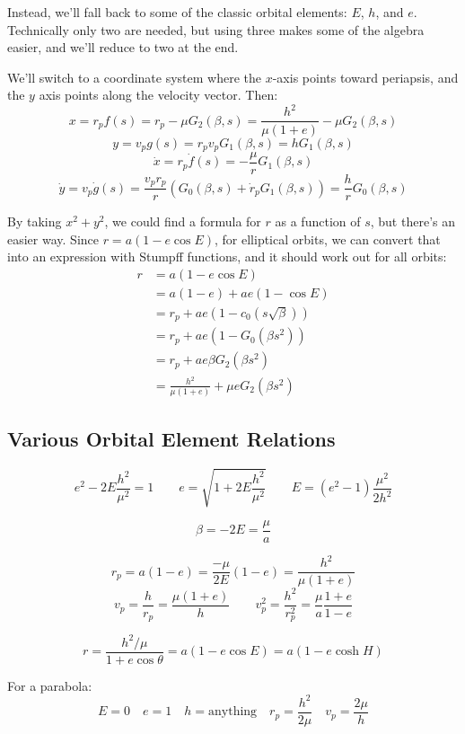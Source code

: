 \documentclass{article}
\numberwithin{equation}{subsection}
\begin{document}
Instead, we'll fall back to some of the classic orbital elements: $E$, $h$, and $e$. Technically only two are needed, but using three makes some of the algebra easier, and we'll reduce to two at the end.

We'll switch to a coordinate system where the $x$-axis points toward periapsis, and the $y$ axis points along the velocity vector. Then:
\[ x = r_p f(s) = r_p - \mu G_2(\beta, s) = \frac{h^2}{\mu (1+e)} - \mu G_2(\beta, s) \]
\[ y = v_p g(s) = r_p v_p G_1(\beta, s) = h G_1(\beta, s) \]
\[ \dot x = r_p \dot{f}(s) = - \frac{\mu}{r} G_1(\beta, s) \]
\[ \dot y = v_p \dot{g}(s) = \frac{v_p r_p}{r} (G_0(\beta, s) + \dot{r}_p G_1(\beta, s)) = \frac{h}{r} G_0(\beta, s) \]

By taking $x^2 + y^2$, we could find a formula for $r$ as a function of $s$, but there's an easier way. Since $r = a(1 - e \cos E)$, for elliptical orbits, we can convert that into an expression with Stumpff functions, and it should work out for all orbits:
\begin{align*}
r &= a(1 - e \cos E) \\
&= a(1-e) + ae(1 - \cos E) \\
&= r_p + ae (1 - c_0(s \sqrt{\beta})) \\
&= r_p + ae (1 - G_0(\beta s^2)) \\
&= r_p + ae \beta G_2(\beta s^2) \\
&= \frac{h^2}{\mu(1+e)} + \mu e G_2(\beta s^2)
\end{align*}





\subsection*{Various Orbital Element Relations}

\[ e^2 - 2E \frac{h^2}{\mu^2} = 1 \qquad e = \sqrt{1 + 2E \frac{h^2}{\mu^2}} \qquad E = (e^2 - 1) \frac{\mu^2}{2h^2} \]

\[ \beta = -2E = \frac{\mu}{a} \]

\[ r_p = a(1-e) = \frac{-\mu}{2E}(1-e) = \frac{h^2}{\mu (1+e)} \]
\[ v_p = \frac{h}{r_p} = \frac{\mu(1+e)}{h} \qquad v_p^2 = \frac{h^2}{r_p^2} = \frac{\mu}{a} \frac{1+e}{1-e} \]

\[ r = \frac{h^2/\mu}{1 + e \cos \theta} = a (1 - e \cos E) = a (1 - e \cosh H) \]

For a parabola:
\[ E = 0 \quad e = 1 \quad h = \textrm{anything} \quad r_p = \frac{h^2}{2\mu} \quad v_p = \frac{2\mu}{h} \]

\end{document}
